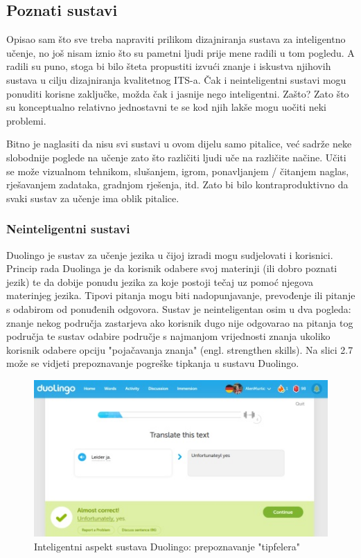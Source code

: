 \documentclass[times, utf8, zavrsni, numeric]{fer}
\begin{document}
\subsection{Poznati sustavi}

Opisao sam što sve treba napraviti prilikom dizajniranja sustava za inteligentno učenje, no još nisam iznio što su pametni ljudi prije mene radili u tom pogledu. A radili su puno, stoga bi bilo šteta propustiti izvući znanje i iskustva njihovih sustava u cilju dizajniranja kvalitetnog ITS-a. Čak i neinteligentni sustavi mogu ponuditi korisne zaključke, možda čak i jasnije nego inteligentni. Zašto? Zato što su konceptualno relativno jednostavni te se kod njih lakše mogu uočiti neki problemi.
\par
Bitno je naglasiti da nisu svi sustavi u ovom dijelu samo pitalice, već sadrže neke slobodnije poglede na učenje zato što različiti ljudi uče na različite načine. Učiti se može vizualnom tehnikom, slušanjem, igrom, ponavljanjem / čitanjem naglas, rješavanjem zadataka, gradnjom rješenja, itd. Zato bi bilo kontraproduktivno da svaki sustav za učenje ima oblik pitalice.

\subsubsection{Neinteligentni sustavi}

Duolingo je sustav za učenje jezika u čijoj izradi mogu sudjelovati i korisnici. Princip rada Duolinga je da korisnik odabere svoj materinji (ili dobro poznati jezik) te da dobije ponudu jezika za koje postoji tečaj uz pomoć njegova materinjeg jezika.\citep{duolingo} Tipovi pitanja mogu biti nadopunjavanje, prevođenje ili pitanje s odabirom od ponuđenih odgovora. Sustav je neinteligentan osim u dva pogleda: znanje nekog područja zastarjeva ako korisnik dugo nije odgovarao na pitanja tog područja te sustav odabire područje s najmanjom vrijednosti znanja ukoliko korisnik odabere opciju "pojačavanja znanja" (engl. strengthen skills). Na slici 2.7 može se vidjeti prepoznavanje pogreške tipkanja u sustavu Duolingo.

\begin{figure}[htb]
	\centering
	\includegraphics[]{img/duolingo.jpg}
	\caption{Inteligentni aspekt sustava Duolingo: prepoznavanje "tipfelera"}
	\label{fig:duolingo}
\end{figure}
\end{document}
